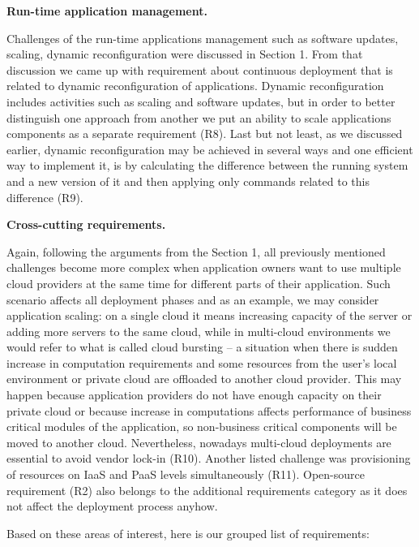 \noindent 

\noindent \textbf{Run-time application management.}

\noindent Challenges of the run-time applications management such as software updates, scaling, dynamic reconfiguration were discussed in Section 1. From that discussion we came up with requirement about continuous deployment that is related to dynamic reconfiguration of applications. Dynamic reconfiguration includes activities such as scaling and software updates, but in order to better distinguish one approach from another we put an ability to scale applications components as a separate requirement (R8). Last but not least, as we discussed earlier, dynamic reconfiguration may be achieved in several ways and one efficient way to implement it, is by calculating the difference between the running system and a new version of it and then applying only commands related to this difference (R9).

\noindent 

\noindent \textbf{Cross-cutting requirements.}

\noindent Again, following the arguments from the Section 1, all previously mentioned challenges become more complex when application owners want to use multiple cloud providers at the same time for different parts of their application. Such scenario affects all deployment phases and as an example, we may consider application scaling: on a single cloud it means increasing capacity of the server or adding more servers to the same cloud, while in multi-cloud environments we would refer to what is called cloud bursting \cite{amedro2010efficient} -- a situation when there is sudden increase in computation requirements and some resources from the user's local environment or private cloud are offloaded to another cloud provider. This may happen because application providers do not have enough capacity on their private cloud or because increase in computations affects performance of business critical modules of the application, so non-business critical components will be moved to another cloud. Nevertheless, nowadays multi-cloud deployments are essential to avoid vendor lock-in (R10). Another listed challenge was provisioning of resources on IaaS and PaaS levels simultaneously (R11). Open-source requirement (R2) also belongs to the additional requirements category as it does not affect the deployment process anyhow.

\noindent 

\noindent Based on these areas of interest, here is our grouped list of requirements:

